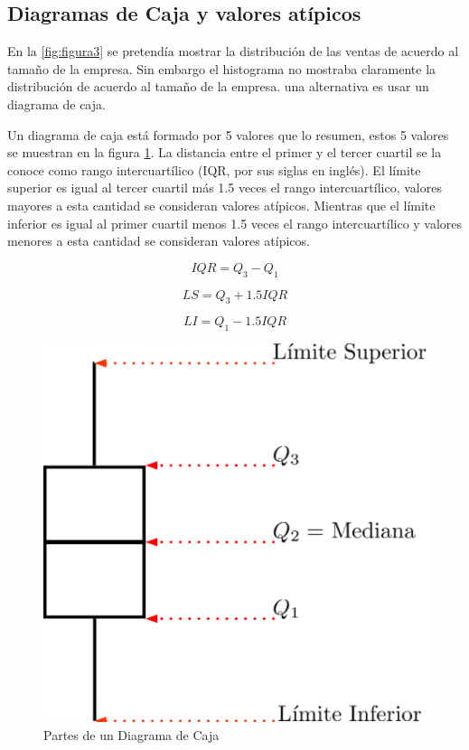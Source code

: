 \documentclass[]{book}
\begin{document}
\hypertarget{boxes}{%
\subsection{Diagramas de Caja y valores atípicos}\label{boxes}}

En la \ref{fig:figura3} se pretendía mostrar la distribución de las ventas de acuerdo al tamaño de la empresa. Sin embargo el histograma no mostraba claramente la distribución de acuerdo al tamaño de la empresa. una alternativa es usar un diagrama de caja.

Un diagrama de caja está formado por 5 valores que lo resumen, estos 5 valores se muestran en la figura \ref{fig:caja1}. La distancia entre el primer y el tercer cuartil se la conoce como rango intercuartílico (IQR, por sus siglas en inglés). El límite superior es igual al tercer cuartil más 1.5 veces el rango intercuartílico, valores mayores a esta cantidad se consideran valores atípicos. Mientras que el límite inferior es igual al primer cuartil menos 1.5 veces el rango intercuartílico y valores menores a esta cantidad se consideran valores atípicos.

\begin{equation} 
  IQR = Q_3 - Q_1
  \label{eq:iqr}
\end{equation}

\begin{equation} 
  LS = Q_3 + 1.5IQR
  \label{eq:ls}
\end{equation}

\begin{equation} 
  LI = Q_1 - 1.5IQR
  \label{eq:li}
\end{equation}

\begin{figure}[h!]

{\centering \includegraphics[width=0.4\linewidth]{boxplot3} 

}

\caption{Partes de un Diagrama de Caja}\label{fig:caja1}
\end{figure}
\end{document}
